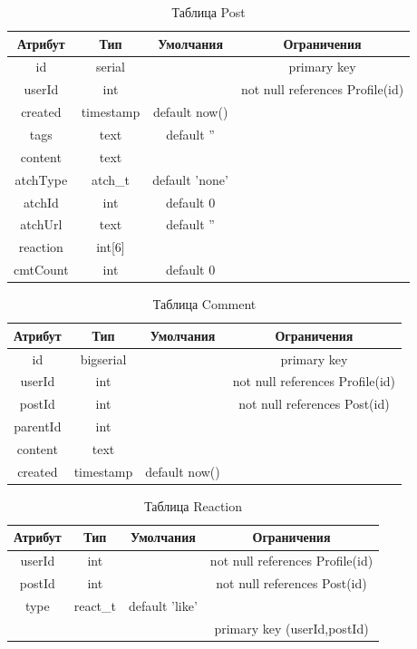 \begin{table}[H]
  \centering
  \begin{tabular}{|c|c|c|c|}
      \hline
      \bfseries Атрибут & \bfseries Тип & \bfseries Умолчания & Ограничения \\
      \hline
id		&	serial &&	primary key \\
userId	&	int		&&not null	references Profile(id)\\
created	&	timestamp			&default now() &\\
tags	&	text	&default 	'' &\\
content	&	text &&\\
atchType&	atch\_t	&default 	'none' &\\
atchId	&	int		&default 	0 &\\
atchUrl	&	text	&default 	'' &\\
reaction&	int[6]  &&\\
cmtCount&	int		&default 	0 &\\
      \hline
  \end{tabular}
  \caption{Таблица Post}
\end{table}


\begin{table}[H]
  \centering
  \begin{tabular}{|c|c|c|c|}
      \hline
      \bfseries Атрибут & \bfseries Тип & \bfseries Умолчания & Ограничения \\
      \hline
id		&	bigserial &&			primary key \\
userId	&	int		&&not null	references Profile(id)\\
postId	&	int		&&not null	references Post(id)	\\
parentId&	int &&\\
content	&	text &&\\
created	&	timestamp			&default now() &\\
      \hline
  \end{tabular}
  \caption{Таблица Comment}
\end{table}


\def\arraystretch{0.92}

\begin{table}[H]
  \centering
  \begin{tabular}{|c|c|c|c|}
      \hline
      \bfseries Атрибут & \bfseries Тип & \bfseries Умолчания & Ограничения \\
      \hline
userId 	&	int		&&not null	references 	Profile(id)\\
postId 	&	int		&&not null	references 	Post(id)\\
type 	&	react\_t	&default 	'like' &\\
&&&primary key	(userId,postId) \\
      \hline
  \end{tabular}
  \caption{Таблица Reaction}
\end{table}


